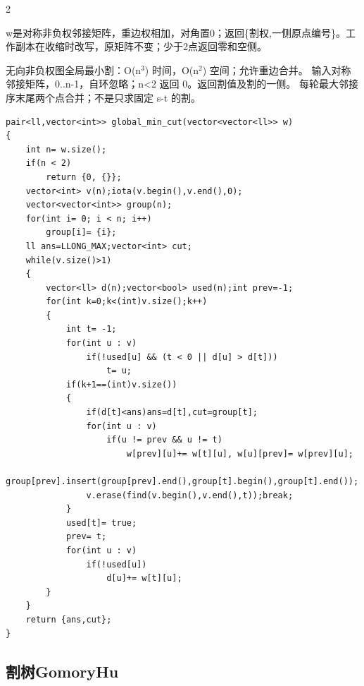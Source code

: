 \documentclass[UTF8,fontset=fandol,a4paper,twoside]{ctexart}
\newcommand{\note}[1]{{\fontsize{10}{12}\selectfont #1\par}}
\begin{document}
\begin{multicols}{2}
\note{w是对称非负权邻接矩阵，重边权相加，对角置0；返回\{割权,\allowbreak{}一侧原点编号\}。工作副本在收缩时改写，原矩阵不变；少于2点返回零和空侧。}
\note{无向非负权图全局最小割：O(\allowbreak{}n\ensuremath{^3})\allowbreak{} 时间，O(\allowbreak{}n\ensuremath{^2})\allowbreak{} 空间；允许重边合并。 输入对称邻接矩阵，0.\allowbreak{}.\allowbreak{}n-\allowbreak{}1，自环忽略；n<\allowbreak{}2 返回 0。返回割值及割的一侧。 每轮最大邻接序末尾两个点合并；不是只求固定 s-\allowbreak{}t 的割。}
\begin{lstlisting}
pair<ll,vector<int>> global_min_cut(vector<vector<ll>> w)
{
    int n= w.size();
    if(n < 2)
        return {0, {}};
    vector<int> v(n);iota(v.begin(),v.end(),0);
    vector<vector<int>> group(n);
    for(int i= 0; i < n; i++)
        group[i]= {i};
    ll ans=LLONG_MAX;vector<int> cut;
    while(v.size()>1)
    {
        vector<ll> d(n);vector<bool> used(n);int prev=-1;
        for(int k=0;k<(int)v.size();k++)
        {
            int t= -1;
            for(int u : v)
                if(!used[u] && (t < 0 || d[u] > d[t]))
                    t= u;
            if(k+1==(int)v.size())
            {
                if(d[t]<ans)ans=d[t],cut=group[t];
                for(int u : v)
                    if(u != prev && u != t)
                        w[prev][u]+= w[t][u], w[u][prev]= w[prev][u];
                group[prev].insert(group[prev].end(),group[t].begin(),group[t].end());
                v.erase(find(v.begin(),v.end(),t));break;
            }
            used[t]= true;
            prev= t;
            for(int u : v)
                if(!used[u])
                    d[u]+= w[t][u];
        }
    }
    return {ans,cut};
}
\end{lstlisting}
\subsection{割树GomoryHu}


\end{multicols}
\end{document}

